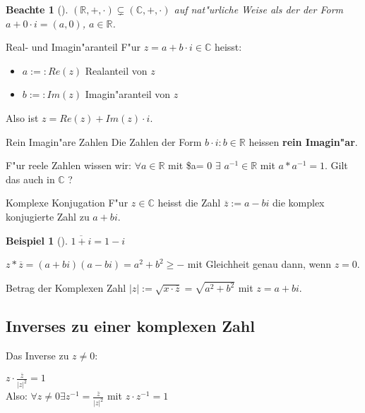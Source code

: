 \documentclass[11pt]{article}
\newtheorem{exa}{Beispiel}[section]
\newtheorem*{notte}{Beachte}
\begin{document}
\begin{notte}[] \label{}
\((\mathbb{R},+,\cdot)\subsetneq (\mathbb{C},+,\cdot)\) auf nat"urliche Weise als
der der Form \(a+0\cdot i = (a,0)\), \(a\in \mathbb{R}\).
\end{notte}

\begin{definition}{Real- und Imagin"aranteil}{}
F"ur \(z=a+b\cdot i\in \mathbb{C}\) heisst:
\begin{itemize}
\item \(a:=:Re(z)\) Realanteil von \(z\)
\item \(b:=:Im(z)\) Imagin"aranteil von \(z\)
\end{itemize}

Also ist \(z=Re(z)+ Im(z)\cdot i\).
\end{definition}

\begin{definition}{Rein Imagin"are Zahlen}{}
Die Zahlen der Form \(b\cdot i : b\in \mathbb{R}\) heissen \textbf{rein Imagin"ar}.
\end{definition}

F"ur reele Zahlen wissen wir: \(\forall a\in \mathbb{R}\) mit \$a\textlnot{}= 0 \(\exists\)
\(a^{-1} \in \mathbb{R}\) mit \(a*a^{-1}=1\). Gilt das auch in \(\mathbb{C}\) ?

\begin{definition}{Komplexe Konjugation}{}
F"ur \(z\in \mathbb{C}\) heisst die Zahl \(\overline{z}:=a-bi\) die komplex
konjugierte Zahl zu \(a+bi\).
\end{definition}

\begin{exa}[] \label{}
\(\overline{1+i}=1-i\)
\end{exa}

\begin{relation}
\(z*\overline{z}=(a+bi)(a-bi)=a^2+b^2\geq -\) mit Gleichheit genau dann, wenn \(z=0\).
\end{relation}

\begin{definition}{Betrag der Komplexen Zahl}{}
\(|z|:=\sqrt{x\cdot \overline{z}}=\sqrt{a^2+b^2}\) mit \(z=a+bi\).
\end{definition}

\subsection{Inverses zu einer komplexen Zahl}
\label{sec:org0018acd}
Das Inverse zu \(z\not= 0\):
\begin{relation}
\(z\cdot \frac{\overline{z}}{|z|^2}=1\) \\
Also: \(\forall z\not= 0 \exists z^{-1} = \frac{\overline{z}}{|z|^2}\) mit \(z \cdot z^{-1}=1\)
\end{relation}
\end{document}
